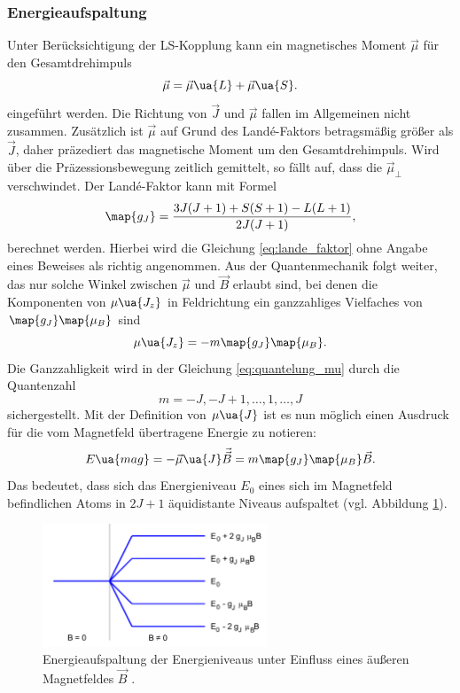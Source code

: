 \subsubsection{Energieaufspaltung}
Unter Berücksichtigung der LS-Kopplung kann ein magnetisches Moment $\vec{\mu}$ für den Gesamtdrehimpuls %
\begin{equation*}
  \vec{\mu}=\vec{\mu}\ua{L} + \vec{\mu}\ua{S}.
\end{equation*}
eingeführt werden.
Die Richtung von $\vec{J}$ und $\vec{\mu}$ fallen im Allgemeinen nicht zusammen. Zusätzlich ist
$\vec{\mu}$ auf Grund des Landé-Faktors betragsmäßig größer als $\vec{J}$, daher präzediert das magnetische Moment um den Gesamtdrehimpuls. %
Wird über die Präzessionsbewegung zeitlich gemittelt, so fällt auf, dass die $\vec{\mu}_{\perp}$ verschwindet. %
Der Landé-Faktor kann mit Formel %
\begin{equation}
  \label{eq:lande_faktor}
  \map{g_J}=\frac{3J(J+1)+S(S+1)-L(L+1)}{2J(J+1)},  %
\end{equation}
berechnet werden. Hierbei wird die Gleichung \eqref{eq:lande_faktor} ohne Angabe eines Beweises als richtig angenommen.
Aus der Quantenmechanik folgt weiter, das nur solche Winkel zwischen $\vec{\mu}$ und %
$\vec{B}$ erlaubt sind, bei denen die Komponenten von $\mu\ua{J_z}$ in Feldrichtung ein ganzzahliges Vielfaches von
$\map{g_J}\map{\mu_B}$ sind
\begin{equation}
  \label{eq:quantelung_mu}
  \mu\ua{J_z}=-m\map{g_J}\map{\mu_B}.
\end{equation}
Die Ganzzahligkeit wird in der Gleichung \eqref{eq:quantelung_mu} durch die Quantenzahl
\begin{equation*}
m=-J,-J+1,\dots,1,\dots, J
\end{equation*}
sichergestellt.
Mit der Definition von $\mu\ua{J}$ ist es nun möglich einen Ausdruck für die vom Magnetfeld übertragene Energie
zu notieren:
\begin{equation}
  \label{eq:energie_mag}
  E\ua{mag}=-\vec{\mu}\ua{J}\vec{\vec{B}}=m\map{g_J}\map{\mu_B}\vec{B}.
\end{equation}
Das bedeutet, dass sich das Energieniveau $E_0$ eines sich im Magnetfeld befindlichen Atoms
in $2J+1$ äquidistante Niveaus aufspaltet (vgl. Abbildung \ref{fig: energie_magnet}).
\FloatBarrier
\begin{figure}[h]
  \centering
  \includegraphics[width=0.6\textwidth]{pics/energieaufspaltung_magnetfeld.png}
  \caption{Energieaufspaltung der Energieniveaus unter Einfluss eines äußeren Magnetfeldes $\vec{B}$ \cite{anleitung27}.}
  \label{fig: energie_magnet}
\end{figure}
\FloatBarrier

